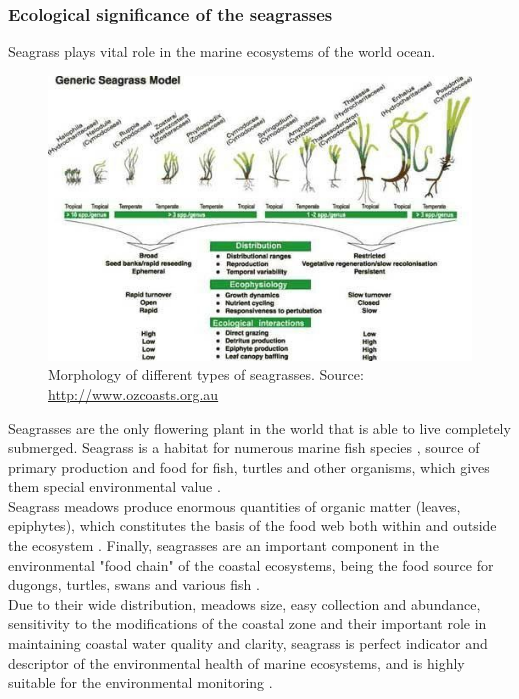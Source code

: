 \documentclass[10pt, a4paper]{article}
\begin{document}
\subsubsection{Ecological significance of the seagrasses}
Seagrass plays vital role in the marine ecosystems of the world ocean. 
\begin{figure}
	\centering
	\includegraphics[scale=0.25]{Fig-1-3.jpg}
	\caption{Morphology of different types of seagrasses. Source: \url{http://www.ozcoasts.org.au}}
	\label{fig:3}
\end{figure}
Seagrasses are the only flowering plant in the world that is able to live completely submerged. Seagrass is a habitat for
numerous marine fish species \cite{Nagelkerken00}\label{Nagelkerken00}, source of primary production and food for
fish, turtles and other organisms, which gives them special environmental value \cite{Noralez10}\label{Noralez10}.\\
Seagrass meadows produce enormous quantities of organic matter (leaves, epiphytes), which
constitutes the basis of the food web both within and outside the ecosystem \cite{Gobert06}\label{Gobert06}.
Finally, seagrasses are an important component in the environmental "food chain" of the coastal
ecosystems, being the food source for dugongs, turtles, swans and various fish \cite{Cappo95}\label{Cappo95}.\\
Due to their wide distribution, meadows size, easy collection and abundance, sensitivity to the
modifications of the coastal zone and their important role in maintaining coastal water quality
and clarity, seagrass is perfect indicator and descriptor of the environmental health of marine
ecosystems, and is highly suitable for the environmental monitoring \cite{Pergent-Martini05}\label{Pergent-Martini05}.\\
\end{document}
